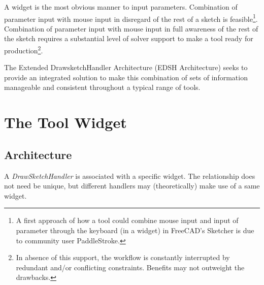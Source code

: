 \documentclass[12pt,twoside,a4paper]{book}
\newcommand{\DrawSketchHandler}{\emph{DrawSketchHandler}}
\begin{document}
    A widget is the most obvious manner to input parameters. Combination of parameter input with mouse input in disregard of the rest of a sketch is feasible\footnote{A first approach of how a tool could combine mouse input and input of parameter through the keyboard (in a widget) in FreeCAD's Sketcher is due to community user PaddleStroke.}. Combination of parameter input with mouse input in full awareness of the rest of the sketch requires a substantial level of solver support to make a tool ready for production\footnote{In absence of this support, the workflow is constantly interrupted by redundant and/or conflicting constraints. Benefits may not outweight the drawbacks.}.

    The Extended DrawsketchHandler Architecture (EDSH Architecture) seeks to provide an integrated solution to make this combination of sets of information manageable and consistent throughout a typical range of tools.

    \chapter{The Tool Widget}

    \section{Architecture}

    A \DrawSketchHandler{} is associated with a specific widget. The relationship does not need be unique, but different handlers may (theoretically) make use of a same widget.
\end{document}
